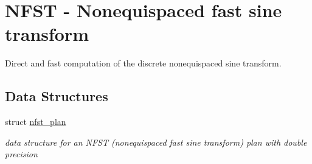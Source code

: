 \hypertarget{group__nfst}{\section{N\-F\-S\-T -\/ Nonequispaced fast sine transform}
\label{group__nfst}
}


Direct and fast computation of the discrete nonequispaced sine transform.  


\subsection*{Data Structures}
\begin{DoxyCompactItemize}
\item 
struct \hyperlink{structnfst__plan}{nfst\-\_\-plan}
\begin{DoxyCompactList}\small\item\em data structure for an N\-F\-S\-T (nonequispaced fast sine transform) plan with double precision \end{DoxyCompactList}\end{DoxyCompactItemize}
